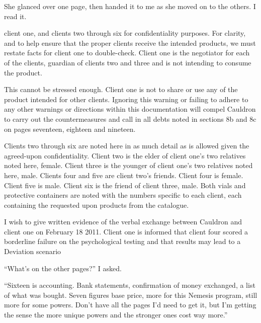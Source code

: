 She glanced over one page, then handed it to me as she moved on to the others.  I read it.



client one, and clients two through six for confidentiality purposes.  For clarity, and to help ensure that the proper clients receive the intended products, we must restate facts for client one to double-check.  Client one is the negotiator for each of the clients, guardian of clients two and three and is not intending to consume the product.



This cannot be stressed enough.  Client one is not to share or use any of the product intended for other clients.  Ignoring this warning or failing to adhere to any other warnings or directions within this documentation will compel Cauldron to carry out the countermeasures and call in all debts noted in sections 8b and 8c on pages seventeen, eighteen and nineteen.



Clients two through six are noted here in as much detail as is allowed given the agreed-upon confidentiality.
\sectionbreak  Client two is the elder of client one's two relatives noted here, female.
\sectionbreak  Client three is the younger of client one's two relatives noted here, male.
\sectionbreak  Clients four and five are client two's friends.  Client four is female.  Client five is male.
\sectionbreak  Client six is the friend of client three, male.
Both vials and protective containers are noted with the numbers specific to each client, each containing the requested upon products from the catalogue.



I wish to give written evidence of the verbal exchange between Cauldron and client one on February 18 2011.  Client one is informed that client four scored a borderline failure on the psychological testing and that results may lead to a Deviation scenario



``What's on the other pages?'' I asked.



``Sixteen is accounting.  Bank statements, confirmation of money exchanged, a list of what was bought.  Seven figures base price, more for this Nemesis program, still more for some powers.  Don't have all the pages I'd need to get it, but I'm getting the sense the more unique powers and the stronger ones cost way more.''



